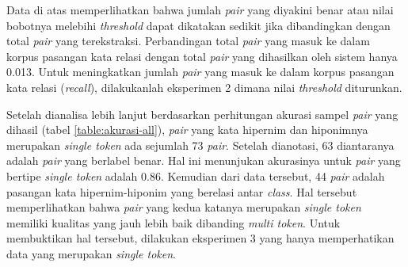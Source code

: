 Data di atas memperlihatkan bahwa jumlah \textit{pair} yang diyakini benar atau nilai bobotnya melebihi \textit{threshold} dapat dikatakan sedikit jika dibandingkan dengan total \textit{pair} yang terekstraksi. Perbandingan total \textit{pair} yang masuk ke dalam korpus pasangan kata relasi dengan total \textit{pair} yang dihasilkan oleh sistem hanya 0.013. Untuk meningkatkan jumlah \textit{pair} yang masuk ke dalam korpus pasangan kata relasi (\textit{recall}), dilakukanlah eksperimen 2 dimana nilai \textit{threshold} diturunkan.

Setelah dianalisa lebih lanjut berdasarkan perhitungan akurasi sampel \textit{pair} yang dihasil (tabel \ref{table:akurasi-all}), \textit{pair} yang kata hipernim dan hiponimnya merupakan \textit{single token} ada sejumlah 73 \textit{pair}. Setelah dianotasi, 63 diantaranya adalah \textit{pair} yang berlabel benar. Hal ini menunjukan akurasinya untuk \textit{pair} yang bertipe \textit{single token} adalah 0.86. Kemudian dari data tersebut, 44 \textit{pair} adalah pasangan kata hipernim-hiponim yang berelasi antar \textit{class}. Hal tersebut memperlihatkan bahwa \textit{pair} yang kedua katanya merupakan \textit{single token} memiliki kualitas yang jauh lebih baik dibanding \textit{multi token}. Untuk membuktikan hal tersebut, dilakukan eksperimen 3 yang hanya memperhatikan data yang merupakan \textit{single token}.
%

